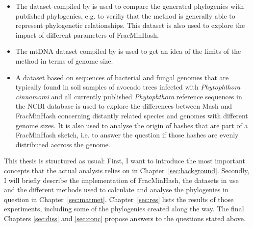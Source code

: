 \begin{itemize}
  \item The dataset compiled by 
  is used to compare the generated phylogenies with published phylogenies, e.g.
  \cite{mandalComparativeGenomeAnalysis2022,yangExpandedPhylogenyGenus2017,abadPhytophthoraTaxonomicPhylogenetic2023a}
  to verifiy that the method is generally able to represent phylogenetic
  relationships. This dataset is also used to explore the impact of
  different parameters of FracMinHash.
  \item The mtDNA dataset compiled by
  \cite{winkworthComparativeAnalysesComplete2022} is used to get an idea of the
  limits of the method in terms of genome size.
  \item A dataset based on sequences of bacterial and fungal genomes that are
  typically found in soil samples of avocado trees infected with
  \textit{Phytophthora cinnamomi} \cite{solis-garciaPhytophthoraRootRot2020} and
  all currently published \textit{Phytophthora} reference sequences in the NCBI
  database is used to explore the differences between Mash and FracMinHash
  concerning distantly related species and genomes with different genome sizes.
  It is also used to analyse the origin of hashes that are part of a FracMinHash
  sketch, i.e. to answer the question if those hashes are evenly distributed
  accross the genome.
\end{itemize}

This thesis is structured as usual: First, I want to introduce the most
important concepts that the actual analysis relies on in
Chapter~\ref{sec:background}. Secondly, I will briefly describe the
implementation of FracMinHash, the datasets in use and the different methods
used to calculate and analyse the phylogenies in question in
Chapter~\ref{sec:matmet}. Chapter~\ref{sec:res} lists the results of those
experiments, including some of the phylogenies created along the way. The final
Chapters \ref{sec:diss} and \ref{sec:conc} propose answers to the questions
stated above. 